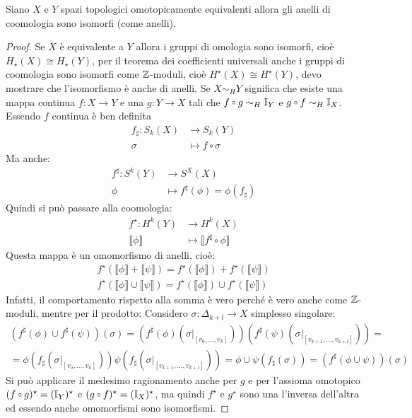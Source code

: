 \begin{lemma}
  Siano $ X $ e $ Y $ spazi topologici omotopicamente equivalenti allora gli
  anelli di coomologia sono isomorfi (come anelli).
\end{lemma}
\begin{proof}
  Se $ X $ è equivalente a $ Y $ allora i gruppi di omologia sono isomorfi, cioè
  $ H_\star(X) \cong H_\star(Y) $, per il teorema dei coefficienti universali anche i gruppi
  di coomologia sono isomorfi come $ \mathbb{Z} $-moduli, cioè $ H^\star(X) \cong H^\star(Y) $,
  devo mostrare che l'isomorfismo è anche di anelli.
  Se $ X \sim_H Y $ significa che esiste una mappa continua $ f \colon X \to Y $ e una
  $ g \colon Y \to X $ tali che $ f \circ g \sim_H \Id{Y} $ e $ g \circ f \sim_H \Id{X} $.
  Essendo $ f $ continua è ben definita
  \begin{align*}
    f_\sharp \colon S_k(X) & \to S_k(Y) \\
    \sigma & \mapsto f \circ \sigma
  \end{align*}
  Ma anche:
  \begin{align*}
    f^\sharp \colon S^k(Y) & \to S^X(X) \\
    \phi & \mapsto f^\sharp(\phi) = \phi(f_\sharp)
  \end{align*}
  Quindi si può passare alla coomologia:
  \begin{align*}
    f^\star \colon H^k(Y) & \to H^k(X) \\
    \llbracket \phi \rrbracket & \mapsto \llbracket f^\sharp \circ \phi \rrbracket
  \end{align*}
  Questa mappa è un omomorfismo di anelli, cioè:
  \begin{gather*}
    f^\star(\llbracket\phi\rrbracket + \llbracket\psi\rrbracket) = f^\star(\llbracket\phi\rrbracket) + f^\star(\llbracket\psi\rrbracket) \\
    f^\star(\llbracket\phi\rrbracket \cup \llbracket\psi\rrbracket) = f^\star(\llbracket\phi\rrbracket) \cup f^\star(\llbracket\psi\rrbracket)
  \end{gather*}
  Infatti, il comportamento rispetto alla somma è vero perché è vero anche come $ \mathbb{Z} $-moduli,
  mentre per il prodotto:
  Considero $ \sigma \colon \Delta_{k+l} \to X $ simplesso singolare:
  \begin{gather*}
    (f^\sharp(\phi) \cup f^\sharp(\psi))(\sigma) = (f^\sharp(\phi)(\sigma\lvert_{[v_0, \dots, v_k]})) (f^\sharp(\psi)(\sigma\lvert_{[v_{k+1}, \dots, v_{k+l}]})) = \\
    = \phi(f_\sharp(\sigma\lvert_{[v_o, \dots, v_k]}))\psi(f_\sharp(\sigma\lvert_{[v_{k+1}, \dots, v_{k+l}]})) = \phi \cup \psi (f_\sharp (\sigma)) = (f^\sharp(\phi \cup \psi))(\sigma)
  \end{gather*}
  Si può applicare il medesimo ragionamento anche per $ g $ e per l'assioma omotopico
  $ (f \circ g)^\star = (\Id{Y})^\star $ e $ (g \circ f)^\star = (\Id{X})^\star $, ma quindi $ f^\star $ e $ g^\star $ sono
  una l'inversa dell'altra ed essendo anche omomorfismi sono isomorfismi.
\end{proof}

